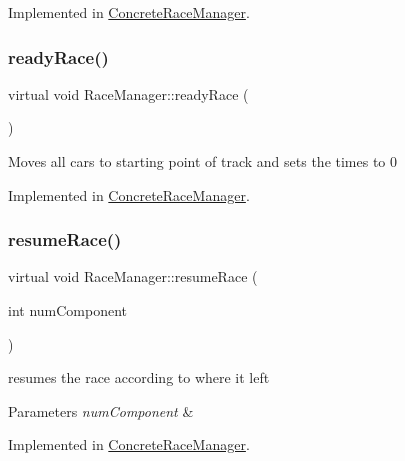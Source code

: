 Implemented in \mbox{\hyperlink{class_concrete_race_manager_abc768656a765994e027399d9e64d7a19}{Concrete\+Race\+Manager}}.

\mbox{\label{class_race_manager_aadeaeec5eaf2d1d8d0178b9fe06116cb}} 
\subsubsection{\texorpdfstring{ready\+Race()}{readyRace()}}
{\footnotesize\ttfamily virtual void Race\+Manager\+::ready\+Race (\begin{DoxyParamCaption}{ }\end{DoxyParamCaption})\hspace{0.3cm}{\ttfamily [pure virtual]}}

Moves all cars to starting point of track and sets the times to 0 

Implemented in \mbox{\hyperlink{class_concrete_race_manager_a52c31abcc79c666388c3c9dd8e285c88}{Concrete\+Race\+Manager}}.

\mbox{\label{class_race_manager_a3a0299ac9a07a2cdc7c1135c6bbff453}} 
\subsubsection{\texorpdfstring{resume\+Race()}{resumeRace()}}
{\footnotesize\ttfamily virtual void Race\+Manager\+::resume\+Race (\begin{DoxyParamCaption}\item[{int}]{num\+Component }\end{DoxyParamCaption})\hspace{0.3cm}{\ttfamily [pure virtual]}}

resumes the race according to where it left 
\begin{DoxyParams}{Parameters}
{\em num\+Component} & \\
\hline
\end{DoxyParams}


Implemented in \mbox{\hyperlink{class_concrete_race_manager_ad57259cf0ed2055a029fe66dc5d298e1}{Concrete\+Race\+Manager}}.

\mbox{\label{class_race_manager_a174c266d650ae1da004a6b1aada152b3}} 
